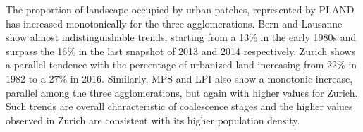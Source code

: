\documentclass[10pt,letterpaper]{article}
\begin{document}
The proportion of landscape occupied by urban patches, represented by PLAND has increased monotonically for the three agglomerations. Bern and Lausanne show almost indistinguishable trends, starting from a 13$\%$ in the early 1980s and surpass the 16$\%$ in the last snapshot of 2013 and 2014 respectively. Zurich shows a parallel tendence with the percentage of urbanized land increasing from 22$\%$ in 1982 to a 27$\%$ in 2016.
Similarly, MPS and LPI also show a monotonic increase, parallel among the three agglomerations, but again with higher values for Zurich. %
Such trends are overall characteristic of coalescence stages and the higher values observed in Zurich are consistent with its higher population density.
\end{document}
